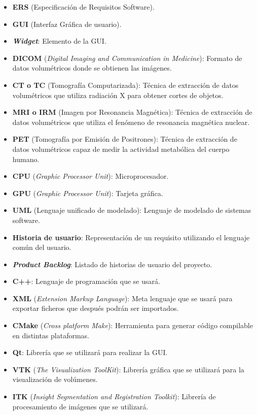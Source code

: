 \begin{itemize}
	\item \textbf{ERS} (Especificación de Requisitos Software).
	\item \textbf{GUI} (Interfaz Gráfica de usuario).
	\item \textbf{\textit{Widget}}: Elemento de la GUI.
	\item \textbf{DICOM} (\textit{Digital Imaging and Communication in Medicine}): Formato de datos volumétricos donde se obtienen las imágenes.
	\item \textbf{CT o TC} (Tomografía Computarizada): Técnica de extracción de datos volumétricos que utiliza radiación X para obtener cortes de objetos.
	\item \textbf{MRI o IRM} (Imagen por Resonancia Magnética): Técnica de extracción de datos volumétricos que utiliza el fenómeno de resonancia magnética nuclear.
	\item \textbf{PET} (Tomografía por Emisión de Positrones): Técnica de extracción de datos volumétricos capaz de medir la actividad metabólica del cuerpo humano.
	\item \textbf{CPU} (\textit{Graphic Processor Unit}): Microprocesador.
	\item \textbf{GPU} (\textit{Graphic Processor Unit}): Tarjeta gráfica.
	\item \textbf{UML} (Lenguaje unificado de modelado): Lenguaje de modelado de sistemas software.
	\item \textbf{Historia de usuario}: Representación de un requisito utilizando el lenguaje común del usuario.
	\item \textbf{\textit{Product Backlog}}: Listado de historias de usuario del proyecto.
	\item \textbf{C++}: Lenguaje de programación que se usará.
	\item \textbf{XML} (\textit{Extension Markup Language}): Meta lenguaje que se usará para exportar ficheros que después podrán ser importados.
	\item \textbf{CMake} (\textit{Cross platform Make}): Herramienta para generar código compilable en distintas plataformas.
	\item \textbf{Qt}: Librería que se utilizará para realizar la GUI.
	\item \textbf{VTK} (\textit{The Visualization ToolKit}): Librería gráfica que se utilizará para la visualización de volúmenes.
	\item \textbf{ITK} (\textit{Insight Segmentation and Registration Toolkit}): Librería de procesamiento de imágenes que se utilizará.

\end{itemize}
